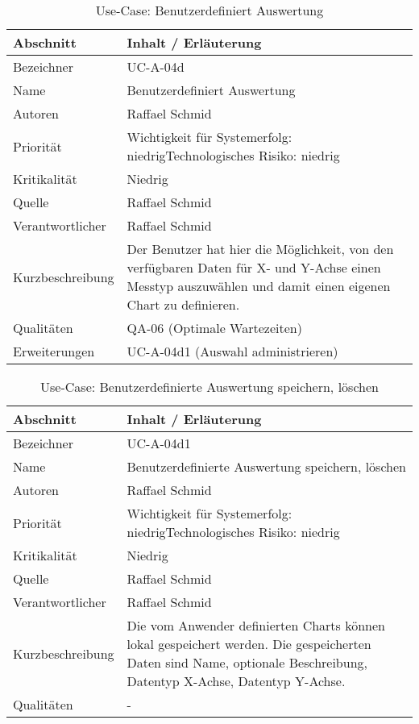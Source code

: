 \begin{longtable}{|p{4cm}|p{10.5cm}|}
\caption{Use-Case: Benutzerdefiniert Auswertung }\\\hline
   \textbf{Abschnitt} & \textbf{Inhalt / Erläuterung} \\\hline
   Bezeichner & UC-A-04d\\\hline
   Name & Benutzerdefiniert Auswertung\\\hline
   Autoren & Raffael Schmid\\\hline
   Priorität & Wichtigkeit für Systemerfolg: niedrig\newline Technologisches Risiko: niedrig\\\hline
   Kritikalität & Niedrig\\\hline
   Quelle & Raffael Schmid\\\hline
   Verantwortlicher & Raffael Schmid\\\hline
   Kurzbeschreibung & Der Benutzer hat hier die Möglichkeit, von den verfügbaren Daten für X- und Y-Achse einen Messtyp auszuwählen und damit einen eigenen Chart zu definieren. \\\hline
   Qualitäten & QA-06 (Optimale Wartezeiten)\\\hline
   Erweiterungen & UC-A-04d1 (Auswahl administrieren)\\\hline
\end{longtable}

\begin{longtable}{|p{4cm}|p{10.5cm}|}
\caption{Use-Case: Benutzerdefinierte Auswertung speichern, löschen }\\\hline
   \textbf{Abschnitt} & \textbf{Inhalt / Erläuterung} \\\hline
   Bezeichner & UC-A-04d1\\\hline
   Name & Benutzerdefinierte Auswertung speichern, löschen\\\hline
   Autoren & Raffael Schmid\\\hline
   Priorität & Wichtigkeit für Systemerfolg: niedrig\newline Technologisches Risiko: niedrig\\\hline
   Kritikalität & Niedrig\\\hline
   Quelle & Raffael Schmid\\\hline
   Verantwortlicher & Raffael Schmid\\\hline
   Kurzbeschreibung & Die vom Anwender definierten Charts können lokal gespeichert werden. Die gespeicherten Daten sind Name, optionale Beschreibung, Datentyp X-Achse, Datentyp Y-Achse.\\\hline
   Qualitäten & -\\\hline
\end{longtable}

